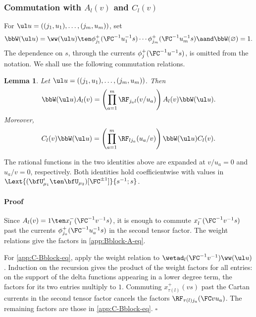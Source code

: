\documentclass[reqno]{amsart}
\numberwithin{equation}{section}
\newtheorem*{lemma}{Lemma}
\newenvironment{pf}{\medskip\paragraph{{\sc Proof}}}{\hfill$\square$\par\medskip}
\begin{document}
\subsubsection{Commutation with $A_l(v)$ and $C_l(v)$}
\label{app:Bblock-A}
For $\ul u=((j_1,u_1),\ldots,(j_m,u_m))$, set
\[
\bbW(\ul u)=\ww(\ul u)\ten \phi_{j_1}^+({\FC^{-1}u_1^{-1}} s)\cdots \phi_{j_m}^+({\FC^{-1}u_m^{-1}} s)
\aand
\bbW(\varnothing)=1.
\]
The dependence on $s$, through the currents $\phi_j^+({\FC^{-1}u^{-1}} s)$, 
is omitted from the notation.
We shall use the following commutation relations.
\begin{lemma}
	Let $\ul u=((j_1,u_1),\ldots,(j_m,u_m))$.  Then
	\begin{equation}
		\bbW(\ul u)A_l(v)=\left(\prod_{a=1}^m\RF_{j_a l}(v/u_a)\right)A_l(v)
		\bbW(\ul u).
		\label{app:Bblock-A-eq}
	\end{equation}
	Moreover,
	\begin{equation}
		C_l(v)\bbW(\ul u)=\left(\prod_{a=1}^m\RF_{l j_a}(u_a/v)\right)
		\bbW(\ul u)C_l(v).
		\label{app:C-Bblock-eq}
	\end{equation}
\end{lemma}

The rational functions in the two identities above are expanded at $v/u_a=0$ and
$u_a/v=0$, respectively. Both identities hold coefficientwise with values in
	$\Lext{(\bfU^\imath_{\mu_1}\ten\bfU_{\mu_2})[\FC^{\pm1}]}{s^{-1};s}$.

\begin{pf}
Since $A_l(v)=1\ten x_l^-({\FC^{-1}v^{-1}} s)$, it is enough to commute $x_l^-({\FC^{-1}v^{-1}} s)$ past the currents $\phi_{j_a}^+({\FC^{-1}u_a^{-1}} s)$ in the second tensor factor. The weight relations give the factors in \eqref{app:Bblock-A-eq}.

For \eqref{app:C-Bblock-eq}, apply the weight relation to
$\wetad_l({\FC^{-1}v^{-1}})\ww(\ul u)$. Induction on the recursion gives the
product of the weight factors for all entries: on the support of the delta functions
appearing in a lower degree term, the factors for its two entries multiply to $1$.
Commuting $x_{\tau(l)}^+(vs)$ past the Cartan currents in the second
tensor factor cancels the factors $\RF_{\tau(l)j_a}(\FC vu_a)$.
The remaining factors are those in \eqref{app:C-Bblock-eq}.
\end{pf}

\end{document}
